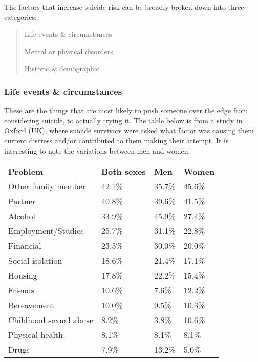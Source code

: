 \documentclass[12pt]{article}
\begin{document}
The factors that increase suicide risk can be broadly broken down into three categories:
\begin{verse}
Life events \& circumstances

Mental or physical disorders

Historic \& demographic
\end{verse}

\subsubsection{Life events \& circumstances}

These are the things that are most likely to push someone over the edge from considering suicide, to actually trying it. The table below is from a study in Oxford (UK), where suicide survivors were asked what factor was causing them current distress and/or contributed to them making their attempt. It is interesting to note the variations between men and women:

\begin{table}[]
\begin{tabular}{llll}
\textbf{Problem}       & \textbf{Both sexes} & \textbf{Men} & \textbf{Women} \\
Other family member    & 42.1\%              & 35.7\%       & 45.6\%         \\
Partner                & 40.8\%              & 39.6\%       & 41.5\%         \\
Alcohol                & 33.9\%              & 45.9\%       & 27.4\%         \\
Employment/Studies     & 25.7\%              & 31.1\%       & 22.8\%         \\
Financial              & 23.5\%              & 30.0\%       & 20.0\%         \\
Social isolation       & 18.6\%              & 21.4\%       & 17.1\%         \\
Housing                & 17.8\%              & 22.2\%       & 15.4\%         \\
Friends                & 10.6\%              & 7.6\%        & 12.2\%         \\
Bereavement            & 10.0\%              & 9.5\%        & 10.3\%         \\
Childhood sexual abuse & 8.2\%               & 3.8\%        & 10.6\%         \\
Physical health        & 8.1\%               & 8.1\%        & 8.1\%          \\
Drugs                  & 7.9\%               & 13.2\%       & 5.0\%         
\end{tabular}
\end{table}
\end{document}
